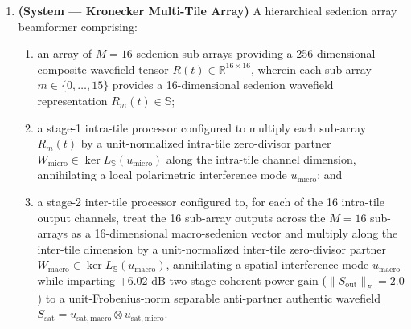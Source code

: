 \documentclass[12pt,letterpaper]{article}
\begin{document}
\begin{enumerate}[leftmargin=20pt,itemsep=4pt]
    \item \textbf{(System --- Kronecker Multi-Tile Array)} A hierarchical sedenion array beamformer comprising:
    \begin{enumerate}[leftmargin=16pt,itemsep=1pt]
        \item an array of $M=16$ sedenion sub-arrays providing a 256-dimensional composite wavefield tensor $R(t) \in \mathbb{R}^{16 \times 16}$, wherein each sub-array $m \in \{0,\dots,15\}$ provides a 16-dimensional sedenion wavefield representation $R_m(t) \in \mathbb{S}$;
        \item a stage-1 intra-tile processor configured to multiply each sub-array $R_m(t)$ by a unit-normalized intra-tile zero-divisor partner $W_{\mathrm{micro}} \in \ker L_{\mathbb{S}}(u_{\mathrm{micro}})$ along the intra-tile channel dimension, annihilating a local polarimetric interference mode $u_{\mathrm{micro}}$; and
        \item a stage-2 inter-tile processor configured to, for each of the 16 intra-tile output channels, treat the 16 sub-array outputs across the $M=16$ sub-arrays as a 16-dimensional macro-sedenion vector and multiply along the inter-tile dimension by a unit-normalized inter-tile zero-divisor partner $W_{\mathrm{macro}} \in \ker L_{\mathbb{S}}(u_{\mathrm{macro}})$, annihilating a spatial interference mode $u_{\mathrm{macro}}$ while imparting $+6.02\text{ dB}$ two-stage coherent power gain ($\|S_{\mathrm{out}}\|_F = 2.0$) to a unit-Frobenius-norm separable anti-partner authentic wavefield $S_{\mathrm{sat}} = u_{\mathrm{sat,macro}} \otimes u_{\mathrm{sat,micro}}$.
    \end{enumerate}


\end{enumerate}
\end{document}
